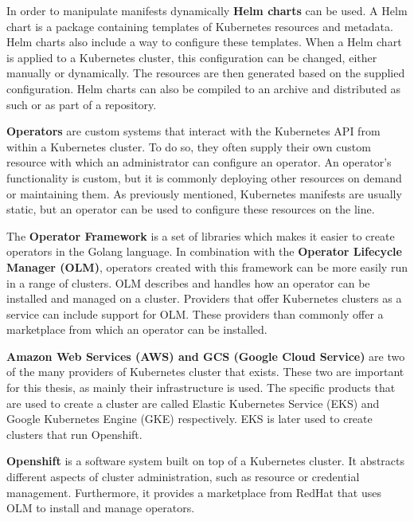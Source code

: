 In order to manipulate manifests dynamically \textbf{Helm charts}\cite{helm-charts} can be used.
A Helm chart is a package containing templates of Kubernetes resources and metadata.
Helm charts also include a way to configure these templates.
When a Helm chart is applied to a Kubernetes cluster, this configuration can be changed, either manually or dynamically.
The resources are then generated based on the supplied configuration.
Helm charts can also be compiled to an archive and distributed as such or as part of a repository.

\textbf{Operators}\cite{kubernetes-operator} are custom systems that interact with the Kubernetes API from within a Kubernetes cluster.
To do so, they often supply their own custom resource with which an administrator can configure an operator.
An operator's functionality is custom, but it is commonly deploying other resources on demand or maintaining them.
As previously mentioned, Kubernetes manifests are usually static, but an operator can be used to configure these resources on the line.

The \textbf{Operator Framework}\cite{operator-framework, operator-lifecycle-manager} is a set of libraries which makes it easier to create operators in the Golang language.
In combination with the \textbf{Operator Lifecycle Manager (OLM)}\cite{operator-lifecycle-manager}, operators created with this framework can be more easily run in a range of clusters.
OLM describes and handles how an operator can be installed and managed on a cluster.
Providers that offer Kubernetes clusters as a service can include support for OLM.
These providers than commonly offer a marketplace from which an operator can be installed.

\textbf{Amazon Web Services (AWS) and GCS (Google Cloud Service)}\cite{eks,gke} are two of the many providers of Kubernetes cluster that exists.
These two are important for this thesis, as mainly their infrastructure is used.
The specific products that are used to create a cluster are called Elastic Kubernetes Service (EKS) and Google Kubernetes Engine (GKE) respectively.
EKS is later used to create clusters that run Openshift.

\textbf{Openshift}\cite{openshift} is a software system built on top of a Kubernetes cluster.
It abstracts different aspects of cluster administration, such as resource or credential management.
Furthermore, it provides a marketplace from RedHat that uses OLM to install and manage operators.
